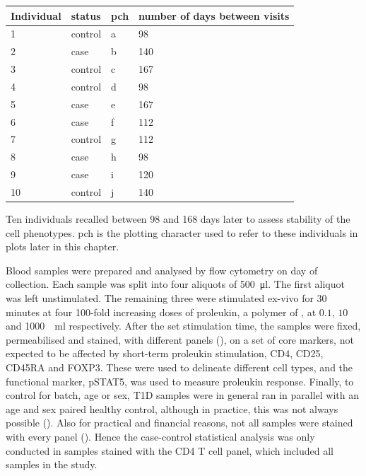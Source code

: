 \begin{table}[ht]
\centering
\begin{tabular}{llll}
  \hline
Individual & status  & pch & number of days between visits \\
  \hline
1          & control & a   & 98 \\
2          & case    & b   & 140 \\
3          & control & c   & 167 \\
4          & control & d   & 98 \\
5          & case    & e   & 167 \\
6          & case    & f   & 112 \\
7          & control & g   & 112 \\
8          & case    & h   & 98 \\
9          & case    & i   & 120 \\
10         & control & j   & 140 \\
   \hline
\end{tabular}
{Ten individuals recalled between 98 and 168 days later to assess stability of the cell phenotypes. }
{
pch is the plotting character used to refer to these individuals in plots later in this chapter.
}
\end{table}
Blood samples were prepared and analysed by flow cytometry on day of collection.
Each sample was split into four aliquots of \SI{500}{\micro\litre}.
The first aliquot was left unstimulated.
The remaining three were stimulated ex-vivo for 30 minutes at four 100-fold increasing doses
of proleukin, a polymer of , at $0.1$, $10$ and \SI{1000}{\unit\per\milli\litre} respectively.
After the set stimulation time, the samples were fixed, permeabilised and stained, with different panels (), 
on a set of core markers, not expected to be affected by short-term proleukin stimulation,
CD4, CD25, CD45RA and FOXP3.
These were used to delineate different cell types, and the functional marker, pSTAT5,
was used to measure proleukin response.
Finally, to control for batch, age or sex, \gls{T1D} samples were in general ran in parallel with an age and sex paired healthy control, although in practice, this was not always possible ().
Also for practical and financial reasons, not all samples were stained with every panel ().
Hence the case-control statistical analysis was only conducted in samples stained with the CD4 T cell panel, which included all samples in the study.

